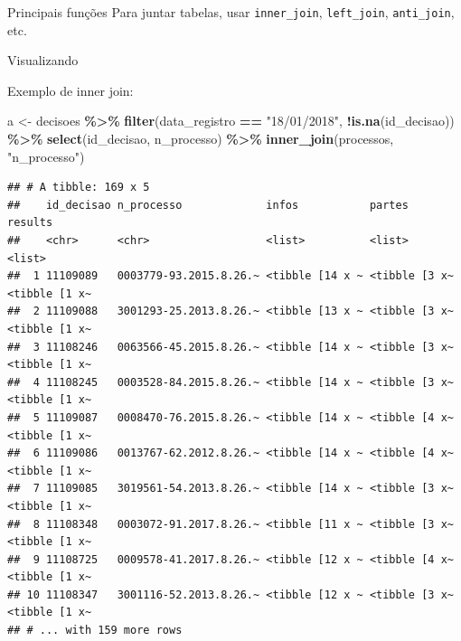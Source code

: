 \documentclass[
  10pt,
  ignorenonframetext,
]{beamer}
\newenvironment{Shaded}{\begin{snugshade}}{\end{snugshade}}
\newcommand{\KeywordTok}[1]{\textcolor[rgb]{0.13,0.29,0.53}{\textbf{#1}}}
\newcommand{\NormalTok}[1]{#1}
\newcommand{\OperatorTok}[1]{\textcolor[rgb]{0.81,0.36,0.00}{\textbf{#1}}}
\newcommand{\StringTok}[1]{\textcolor[rgb]{0.31,0.60,0.02}{#1}}
\begin{document}
\begin{frame}[fragile]{Principais funções}
\protect\hypertarget{principais-funuxe7uxf5es}{}
Para juntar tabelas, usar \texttt{inner\_join}, \texttt{left\_join},
\texttt{anti\_join}, etc.
\end{frame}

\begin{frame}{Visualizando}
\protect\hypertarget{visualizando}{}
\end{frame}

\begin{frame}[fragile]{Exemplo de inner join:}
\protect\hypertarget{exemplo-de-inner-join}{}
\begin{Shaded}
\begin{Highlighting}[]
\NormalTok{a \textless{}{-}}\StringTok{ }\NormalTok{decisoes }\OperatorTok{\%\textgreater{}\%}\StringTok{ }
\StringTok{  }\KeywordTok{filter}\NormalTok{(data\_registro }\OperatorTok{==}\StringTok{ "18/01/2018"}\NormalTok{, }\OperatorTok{!}\KeywordTok{is.na}\NormalTok{(id\_decisao)) }\OperatorTok{\%\textgreater{}\%}\StringTok{ }
\StringTok{  }\KeywordTok{select}\NormalTok{(id\_decisao, n\_processo) }\OperatorTok{\%\textgreater{}\%}\StringTok{ }
\StringTok{  }\KeywordTok{inner\_join}\NormalTok{(processos, }\StringTok{"n\_processo"}\NormalTok{)}
\end{Highlighting}
\end{Shaded}
\end{frame}

\begin{frame}[fragile]{}
\protect\hypertarget{section-5}{}
\begin{verbatim}
## # A tibble: 169 x 5
##    id_decisao n_processo             infos           partes        results      
##    <chr>      <chr>                  <list>          <list>        <list>       
##  1 11109089   0003779-93.2015.8.26.~ <tibble [14 x ~ <tibble [3 x~ <tibble [1 x~
##  2 11109088   3001293-25.2013.8.26.~ <tibble [13 x ~ <tibble [3 x~ <tibble [1 x~
##  3 11108246   0063566-45.2015.8.26.~ <tibble [14 x ~ <tibble [3 x~ <tibble [1 x~
##  4 11108245   0003528-84.2015.8.26.~ <tibble [14 x ~ <tibble [3 x~ <tibble [1 x~
##  5 11109087   0008470-76.2015.8.26.~ <tibble [14 x ~ <tibble [4 x~ <tibble [1 x~
##  6 11109086   0013767-62.2012.8.26.~ <tibble [14 x ~ <tibble [4 x~ <tibble [1 x~
##  7 11109085   3019561-54.2013.8.26.~ <tibble [14 x ~ <tibble [3 x~ <tibble [1 x~
##  8 11108348   0003072-91.2017.8.26.~ <tibble [11 x ~ <tibble [3 x~ <tibble [1 x~
##  9 11108725   0009578-41.2017.8.26.~ <tibble [12 x ~ <tibble [4 x~ <tibble [1 x~
## 10 11108347   3001116-52.2013.8.26.~ <tibble [12 x ~ <tibble [3 x~ <tibble [1 x~
## # ... with 159 more rows
\end{verbatim}
\end{frame}
\end{document}
